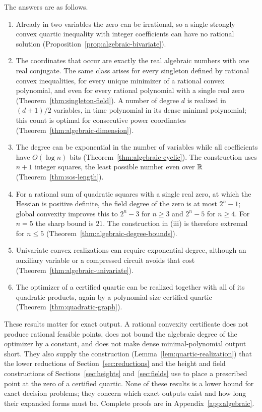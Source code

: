 The answers are as follows.
\begin{enumerate}[label=(\roman*)]
\item Already in two variables the zero can be irrational, so a single
  strongly convex quartic inequality with integer coefficients can have no
  rational solution (Proposition~\ref{prop:algebraic-bivariate}).
\item The coordinates that occur are exactly the real algebraic numbers with
  one real conjugate. The same class arises for every singleton defined by
  rational convex inequalities, for every unique minimizer of a rational convex
  polynomial, and even for every rational polynomial with a single real zero
  (Theorem~\ref{thm:singleton-field}). A number of degree $d$ is realized in
  $(d+1)/2$ variables, in time polynomial in its dense minimal polynomial; this
  count is optimal for consecutive power coordinates
  (Theorem~\ref{thm:algebraic-dimension}).
\item The degree can be exponential in the number of variables while all
  coefficients have $O(\log n)$ bits (Theorem~\ref{thm:algebraic-cyclic}).
  The construction uses $n+1$ integer squares, the least possible number even
  over $\mathbb R$ (Theorem~\ref{thm:sos-length}).
\item For a rational sum of quadratic squares with a single real zero, at
  which the Hessian is positive definite, the field degree of the zero is at
  most $2^n-1$; global convexity improves this to $2^n-3$ for $n\ge3$ and
  $2^n-5$ for $n\ge4$. For $n=5$ the sharp bound is $21$.
  The construction in (iii) is therefore extremal for
  $n\le5$ (Theorem~\ref{thm:algebraic-degree-bounds}).
\item Univariate convex realizations can require exponential degree, although
  an auxiliary variable or a compressed circuit avoids that cost
  (Theorem~\ref{thm:algebraic-univariate}).
\item The optimizer of a certified quartic can be realized together with all
  of its quadratic products, again by a polynomial-size certified quartic
  (Theorem~\ref{thm:quadratic-graph}).
\end{enumerate}
These results matter for exact output. A rational convexity certificate does
not produce rational feasible points, does not bound the algebraic degree of
the optimizer by a constant, and does not make dense minimal-polynomial output
short. They also supply the construction (Lemma~\ref{lem:quartic-realization})
that the lower reductions of Section~\ref{sec:reductions} and the height and
field constructions of Sections~\ref{sec:heights} and~\ref{sec:fields} use to
place a prescribed point at the zero of a certified quartic. None of these
results is a lower bound for exact decision problems; they concern which
exact outputs exist and how long their expanded forms must be. Complete proofs
are in Appendix~\ref{app:algebraic}.


